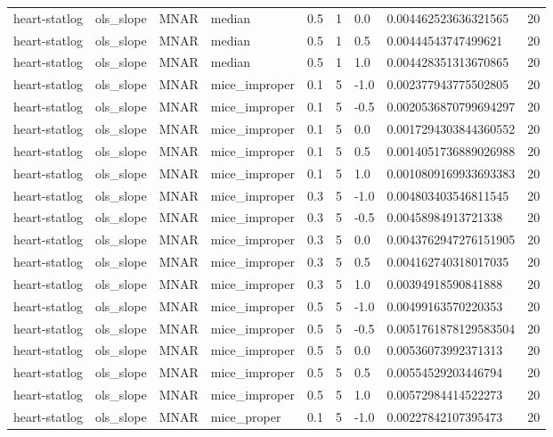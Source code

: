 \begin{tabular}{lllllllll}
heart-statlog & ols\_slope & MNAR & median & 0.5 & 1 & 0.0 & 0.004462523636321565 & 20 \\
heart-statlog & ols\_slope & MNAR & median & 0.5 & 1 & 0.5 & 0.00444543747499621 & 20 \\
heart-statlog & ols\_slope & MNAR & median & 0.5 & 1 & 1.0 & 0.004428351313670865 & 20 \\
heart-statlog & ols\_slope & MNAR & mice\_improper & 0.1 & 5 & -1.0 & 0.002377943775502805 & 20 \\
heart-statlog & ols\_slope & MNAR & mice\_improper & 0.1 & 5 & -0.5 & 0.0020536870799694297 & 20 \\
heart-statlog & ols\_slope & MNAR & mice\_improper & 0.1 & 5 & 0.0 & 0.0017294303844360552 & 20 \\
heart-statlog & ols\_slope & MNAR & mice\_improper & 0.1 & 5 & 0.5 & 0.0014051736889026988 & 20 \\
heart-statlog & ols\_slope & MNAR & mice\_improper & 0.1 & 5 & 1.0 & 0.0010809169933693383 & 20 \\
heart-statlog & ols\_slope & MNAR & mice\_improper & 0.3 & 5 & -1.0 & 0.004803403546811545 & 20 \\
heart-statlog & ols\_slope & MNAR & mice\_improper & 0.3 & 5 & -0.5 & 0.00458984913721338 & 20 \\
heart-statlog & ols\_slope & MNAR & mice\_improper & 0.3 & 5 & 0.0 & 0.0043762947276151905 & 20 \\
heart-statlog & ols\_slope & MNAR & mice\_improper & 0.3 & 5 & 0.5 & 0.004162740318017035 & 20 \\
heart-statlog & ols\_slope & MNAR & mice\_improper & 0.3 & 5 & 1.0 & 0.00394918590841888 & 20 \\
heart-statlog & ols\_slope & MNAR & mice\_improper & 0.5 & 5 & -1.0 & 0.00499163570220353 & 20 \\
heart-statlog & ols\_slope & MNAR & mice\_improper & 0.5 & 5 & -0.5 & 0.0051761878129583504 & 20 \\
heart-statlog & ols\_slope & MNAR & mice\_improper & 0.5 & 5 & 0.0 & 0.00536073992371313 & 20 \\
heart-statlog & ols\_slope & MNAR & mice\_improper & 0.5 & 5 & 0.5 & 0.00554529203446794 & 20 \\
heart-statlog & ols\_slope & MNAR & mice\_improper & 0.5 & 5 & 1.0 & 0.00572984414522273 & 20 \\
heart-statlog & ols\_slope & MNAR & mice\_proper & 0.1 & 5 & -1.0 & 0.00227842107395473 & 20 \\

\end{tabular}
